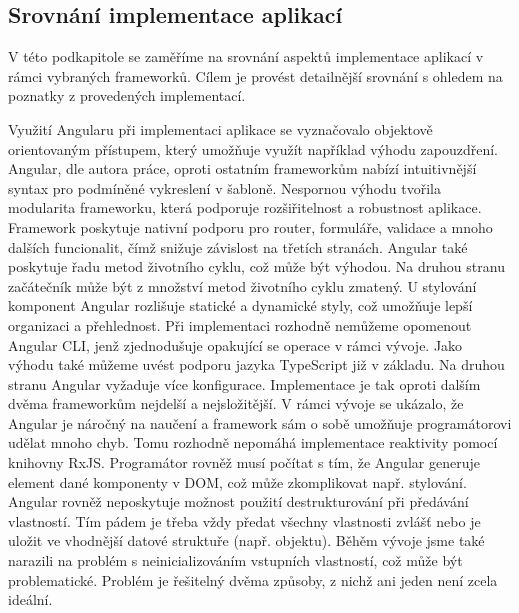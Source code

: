\subsection{Srovnání implementace aplikací}

V této podkapitole se zaměříme na srovnání aspektů implementace aplikací v rámci vybraných frameworků. 
Cílem je provést detailnější srovnání s ohledem na poznatky z provedených implementací. 

Využití Angularu při implementaci aplikace se vyznačovalo objektově orientovaným přístupem, který umožňuje využít například výhodu zapouzdření. 
Angular, dle autora práce, oproti ostatním frameworkům nabízí intuitivnější syntax pro podmíněné vykreslení v šabloně. 
Nespornou výhodu tvořila modularita frameworku, která podporuje rozšiřitelnost a robustnost aplikace. 
Framework poskytuje nativní podporu pro router, formuláře, validace a mnoho dalších funcionalit, čímž snižuje závislost na třetích stranách. 
Angular také poskytuje řadu metod životního cyklu, což může být výhodou. Na druhou stranu začátečník může být z množství metod životního cyklu zmatený. 
U stylování komponent Angular rozlišuje statické a dynamické styly, což umožňuje lepší organizaci a přehlednost. 
Při implementaci rozhodně nemůžeme opomenout Angular CLI, jenž zjednodušuje opakující se operace v rámci vývoje. 
Jako výhodu také můžeme uvést podporu jazyka TypeScript již v základu. 
Na druhou stranu Angular vyžaduje více konfigurace. Implementace je tak oproti dalším dvěma frameworkům nejdelší a nejsložitější. 
V rámci vývoje se ukázalo, že Angular je náročný na naučení a framework sám o sobě umožňuje programátorovi udělat mnoho chyb. 
Tomu rozhodně nepomáhá implementace reaktivity pomocí knihovny RxJS. 
Programátor rovněž musí počítat s tím, že Angular generuje element dané komponenty v DOM, což může zkomplikovat např. stylování. 
Angular rovněž neposkytuje možnost použití destrukturování při předávání vlastností. 
Tím pádem je třeba vždy předat všechny vlastnosti zvlášť nebo je uložit ve vhodnější datové struktuře (např. objektu).
Běhěm vývoje jsme také narazili na problém s neinicializováním vstupních vlastností, což může být problematické. 
Problém je řešitelný dvěma způsoby, z nichž ani jeden není zcela ideální.


